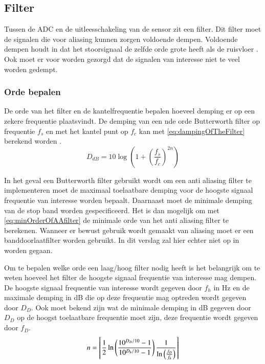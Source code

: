 \subsection{Filter}
Tussen de ADC en de uitleesschakeling van de sensor zit een filter. Dit filter moet de signalen die voor aliasing kunnen zorgen voldoende dempen. Voldoende dempen houdt in dat het stoorsignaal de zelfde orde grote heeft als de ruisvloer \cite{energieZuinigeSystemenOntwerpen}. Ook moet er voor worden gezorgd dat de signalen van interesse niet te veel worden gedempt.

\subsubsection{Orde bepalen} \label{sec:DetermineAAorder}
De orde van het filter en de kantelfrequentie bepalen hoeveel demping er op een zekere frequentie plaatsvindt. De demping van een nde orde Butterworth filter op frequentie $f_s$ en met het kantel punt op $f_c$ kan met \cref{eq:dampingOfTheFilter} berekend worden \cite{electronicFilterDesignHandbook}.
\begin{equation} \label{eq:dampingOfTheFilter}
    D_{dB}=10\log\left(1+\left(\frac{f_s}{f_c}\right)^{2n}\right)
\end{equation}

In het geval een Butterworth filter gebruikt wordt om een anti aliasing filter te implementeren moet de maximaal toelaatbare demping voor de hoogste signaal frequentie van interesse worden bepaalt. Daarnaast moet de minimale demping van de stop band worden gespecificeerd. Het is dan mogelijk om met \cref{eq:minOrderOfAAfilter} de minimale orde van het anti aliasing filter te berekenen.
Wanneer er bewust gebruik wordt gemaakt van aliasing moet er een banddoorlaatfilter worden gebruikt. In dit verslag zal hier echter niet op in worden gegaan.

Om te bepalen welke orde een laag/hoog filter nodig heeft is het belangrijk om te weten hoeveel het filter de hoogste signaal frequentie van interesse mag dempen. De hoogste signaal frequentie van interesse wordt gegeven door $f_h$ in Hz en de maximale demping in dB die op deze frequentie mag optreden wordt gegeven door $D_D$. Ook moet bekend zijn wat de minimale demping in dB gegeven door $D_D$ op de hoogst toelaatbare frequentie moet zijn, deze frequentie wordt gegeven door $f_D$.
\begin{equation} \label{eq:minOrderOfAAfilter}
    n=\left\lceil\frac{1}{2}\ln\left(\frac{10^{D_D/10}-1}{10^{D_h/10}-1}\right)\frac{1}{\ln\left(\frac{f_D}{f_h}\right)}\right\rceil
    \tagaddtext{[order]}
\end{equation}

